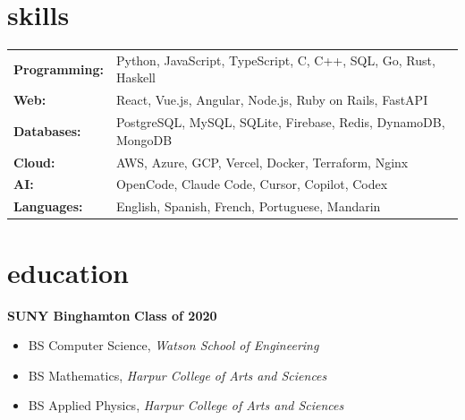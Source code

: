 \documentclass{article}
\newcommand{\subsubsectiontext}[1]{
    \hspace*{.5cm}%
    \begin{minipage}{.9\textwidth}%
    #1
    \end{minipage}%
}
\begin{document}
\section{skills}

\noindent\begin{tabular}{@{}p{}p{}@{}}
\textbf{Programming:} & Python, JavaScript, TypeScript, C, C++, SQL, Go, Rust, Haskell \\
\textbf{Web:} & React, Vue.js, Angular, Node.js, Ruby on Rails, FastAPI \\
\textbf{Databases:} & PostgreSQL, MySQL, SQLite, Firebase, Redis, DynamoDB, MongoDB \\
\textbf{Cloud:} & AWS, Azure, GCP, Vercel, Docker, Terraform, Nginx \\
\textbf{AI:} & OpenCode, Claude Code, Cursor, Copilot, Codex \\
\textbf{Languages:} & English, Spanish, French, Portuguese, Mandarin
\end{tabular}

\section{education}

\noindent \textbf{SUNY Binghamton} \hfill \textbf{Class of 2020}
\subsubsectiontext{
    \begin{itemize}
        \item BS Computer Science, \textit{Watson School of Engineering}
        \item BS Mathematics, \textit{Harpur College of Arts and Sciences}
        \item BS Applied Physics, \textit{Harpur College of Arts and Sciences}
    \end{itemize}
}
\end{document}
